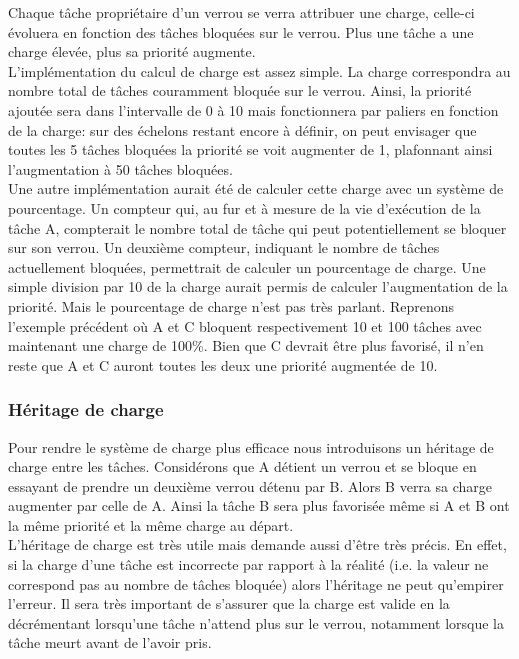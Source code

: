 Chaque tâche propriétaire d'un verrou se verra attribuer une charge, celle-ci évoluera en fonction
des tâches bloquées sur le verrou. Plus une tâche a une charge élevée, plus sa priorité augmente.
\\

L'implémentation du calcul de charge est assez simple. 
La charge correspondra au nombre total de tâches couramment bloquée sur le verrou. 
Ainsi, la priorité ajoutée sera dans l'intervalle de 0 à 10 mais fonctionnera par
paliers en fonction de la charge: sur des échelons restant encore à définir, on peut
envisager que toutes les 5 tâches bloquées la priorité se voit augmenter de 1,
plafonnant ainsi l'augmentation à 50 tâches bloquées.
\\

Une autre implémentation aurait été de calculer cette charge avec un système 
de pourcentage. Un compteur qui, au fur et à mesure de la vie d'exécution de la
tâche A, compterait le nombre total de tâche qui peut potentiellement se bloquer
sur son verrou. Un deuxième compteur, indiquant le nombre de tâches actuellement
bloquées, permettrait de calculer un pourcentage de charge. Une simple division
par 10 de la charge aurait permis de calculer l'augmentation de la priorité. Mais
le pourcentage de charge n'est pas très parlant. Reprenons l'exemple précédent
où A et C bloquent respectivement 10 et 100 tâches avec maintenant une charge 
de 100\%.
Bien que C devrait être plus favorisé, il n'en reste que A et C auront toutes 
les deux une priorité augmentée de 10.


\subsubsection{Héritage de charge}

Pour rendre le système de charge plus efficace nous introduisons un héritage
de charge entre les tâches. Considérons que A détient un verrou et se bloque
en essayant de prendre un deuxième verrou détenu par B. Alors B verra sa
charge augmenter par celle de A. Ainsi la tâche B sera plus favorisée même
si A et B ont la même priorité et la même charge au départ.
\\

L'héritage de charge est très utile mais demande aussi d'être très précis.
En effet, si la charge d'une tâche est incorrecte par rapport à la réalité
(i.e. la valeur ne correspond pas au nombre de tâches bloquée)
alors l'héritage ne peut qu'empirer l'erreur. Il sera très important
de s'assurer que la charge est valide en la décrémentant lorsqu'une tâche 
n'attend plus sur le verrou, notamment lorsque la tâche meurt avant de l'avoir pris.


